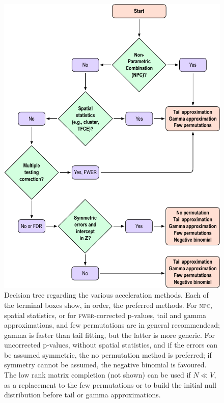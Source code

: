 \begin{figure}[!p]
\begin{center}
\includegraphics{figures/recomm.pdf}
\end{center}
\caption{Decision tree regarding the various acceleration methods. Each of the terminal boxes show, in order, the preferred methods. For \textsc{npc}, spatial statistics, or for \textsc{fwer}-corrected p-values, tail and gamma approximations, and few permutations are in general recommendead; gamma is faster than tail fitting, but the latter is more generic. For uncorrected p-values, without spatial statistics, and if the errors can be assumed symmetric, the no permutation method is preferred; if symmetry cannot be assumed, the negative binomial is favoured. The low rank matrix completion (not shown) can be used if $N \ll V$, as a replacement to the few permutations or to build the initial null distribution before tail or gamma approximations.}
\label{fig:recomm}
\end{figure}

